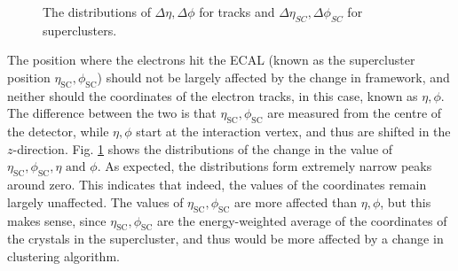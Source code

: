 \documentclass[10pt]{article}
\begin{document}
\begin{figure}[h!]
\begin{subfigure}[b]{0.24\textwidth}
        \end{subfigure}
        \caption{The distributions of $\Delta\eta,\Delta\phi$ for tracks and $\Delta\eta_{SC},\Delta\phi_{SC}$ for superclusters.}
        \label{posValidation}
\end{figure}

The position where the electrons hit the ECAL (known as the supercluster position $\eta_{\text{SC}},\phi_{\text{SC}}$) should not be largely affected by the change in framework, and neither should the coordinates of the electron tracks, in this case, known as $\eta,\phi$. The difference between the two is that $\eta_{\text{SC}},\phi_{\text{SC}}$ are measured from the centre of the detector, while $\eta,\phi$ start at the interaction vertex, and thus are shifted in the $z$-direction. Fig. \ref{posValidation} shows the distributions of the change in the value of $\eta_{\text{SC}},\phi_{\text{SC}},\eta \text{ and } \phi$. As expected, the distributions form extremely narrow peaks around zero. This indicates that indeed, the values of the coordinates remain largely unaffected. The values of $\eta_{\text{SC}},\phi_{\text{SC}}$ are more affected than $\eta,\phi$, but this makes sense, since $\eta_{\text{SC}},\phi_{\text{SC}}$ are the energy-weighted average of the coordinates of the crystals in the supercluster, and thus would be more affected by a change in clustering algorithm.
\end{document}
